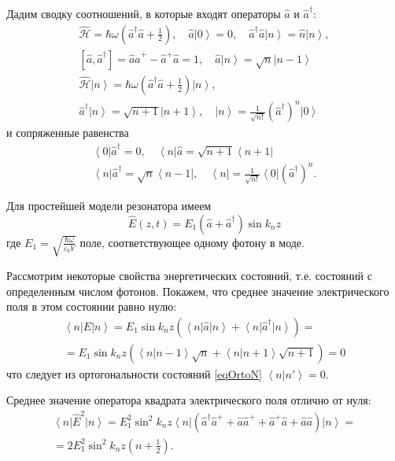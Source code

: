 Дадим сводку соотношений, в которые входят операторы $\hat{a}$ и $\hat{a}^{\dag}$:
\begin{eqnarray}
\hat{\mathcal{H}} = \hbar \omega \left(\hat{a}^{\dag}\hat{a} +
\frac{1}{2} \right),
\quad
\hat{a}\left|0\right> = 0,
\quad
\hat{a}^{\dag}\hat{a}\left|n\right> = \hat{n}\left|n\right>,
\nonumber \\
\left[\hat{a}, \hat{a}^{\dag}\right] = \hat{a} \hat{a}^{+} - \hat{a}^{+}
\hat{a} = 1,
\quad
\hat{a}\left|n\right> = \sqrt{n}\left|n - 1\right>
\nonumber \\
\hat{\mathcal{H}}\left|n\right> = \hbar \omega \left(\hat{a}^{\dag}\hat{a} +
\frac{1}{2} \right)\left|n\right>,
\nonumber \\
\hat{a}^{\dag}\left|n\right> = \sqrt{n + 1}\left|n + 1\right>,
\quad
\left|n\right> = \frac{1}{\sqrt{n!}}\left(\hat{a}^{\dag}\right)^n\left|0\right>
\end{eqnarray}
и сопряженные равенства
\begin{eqnarray}
\left<0\right|\hat{a}^{\dag} = 0,
\quad
\left<n\right|\hat{a} = \sqrt{n + 1}\left<n + 1\right|
\nonumber \\
\left<n\right|\hat{a}^{\dag} = \sqrt{n}\left<n - 1\right|,
\quad
\left<n\right| =  \frac{1}{\sqrt{n!}} \left<0\right|\left(\hat{a}^{\dag}\right)^n.
\end{eqnarray}

Для простейшей модели резонатора имеем
\[
\hat{E}\left(z, t\right) = E_1\left( \hat{a} +
\hat{a}^{\dag}\right) \sin k_n z
\]
где $E_1 = \sqrt{\frac{\hbar \omega}{\varepsilon_0 V}}$  поле,
соответствующее одному фотону в моде.  

Рассмотрим некоторые свойства энергетических состояний, т.е. состояний
с определенным числом фотонов. Покажем, что среднее значение
электрического поля в этом состоянии равно нулю: 
\begin{eqnarray}
\left<n\right|\hat{E}\left|n\right> = 
E_1 \sin k_n z \left( \left<n\right|\hat{a}\left|n\right> +
\left<n\right|\hat{a}^{\dag}\left|n\right>\right) =
\nonumber \\
= E_1 \sin k_n z \left( \left<n\right|\left.n - 1\right> \sqrt{n} +
\left<n\right|\left.n + 1\right> \sqrt{n + 1}
\right) = 0
\label{eqCh1_E_middle}
\end{eqnarray}
что следует из ортогональности состояний \eqref{eqOrtoN}
$\left<n\right|\left.n'\right> = 0$.

Среднее значение оператора квадрата электрического поля отлично от нуля:
\begin{eqnarray}
\left<n\right|\hat{E}^2\left|n\right> = 
E_1^2 \sin^2 k_n z \left<n\right|
\left(
\hat{a}^{\dag} \hat{a}^{+} + \hat{a} \hat{a}^{+} + \hat{a}^{+} \hat{a} +
\hat{a} \hat{a}
\right)
\left|n\right> =
\nonumber \\
= 2 E_1^2 \sin^2 k_n z \left( n + \frac{1}{2}
\right).
\label{eqCh1_E2_middle}
\end{eqnarray}

